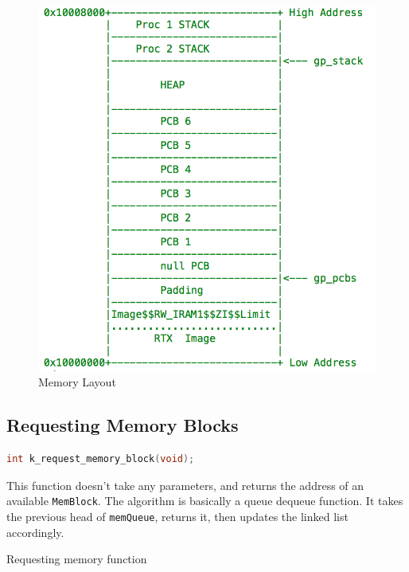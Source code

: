 \documentclass[12pt]{report}
\begin{document}
\begin{figure}[h!]
  \centering
	\includegraphics{memory.png}
\caption{Memory Layout}

\end{figure}

\subsection{Requesting Memory Blocks}

\begin{minipage}{\textwidth}
\begin{lstlisting}[language=C, frame=single]
int k_request_memory_block(void);
\end{lstlisting}
\end{minipage}

This function doesn't take any parameters, and returns the address of an available \texttt{MemBlock}. The algorithm is basically a queue dequeue function. It takes the previous head of \texttt{memQueue}, returns it, then updates the linked list accordingly.

\begin{algorithm}
  \caption{Requesting memory function}
  \begin{algorithmic}[1]
	  \EndWhile
    \EndProcedure
  \end{algorithmic}
\end{algorithm}
\end{document}
